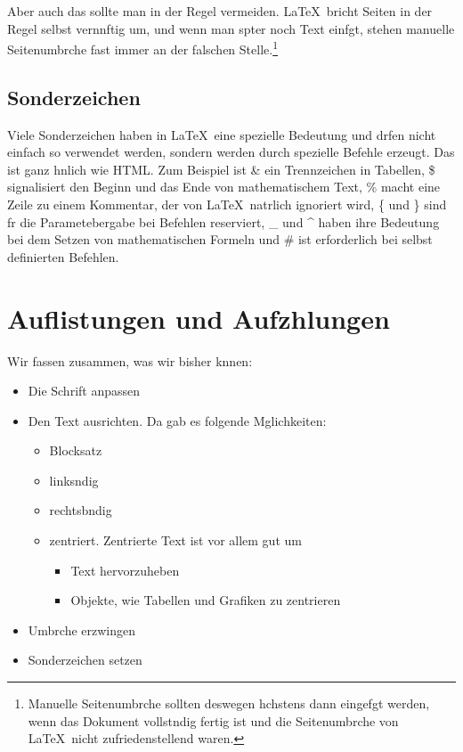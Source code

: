 \documentclass[11pt,a4paper]{article} %
\begin{document}
\newpage

Aber auch das sollte man in der Regel vermeiden. \LaTeX\ bricht Seiten in der Regel selbst vernnftig um, und wenn man spter noch Text einfgt, stehen manuelle Seitenumbrche fast immer an der falschen Stelle.\footnote{Manuelle Seitenumbrche sollten deswegen hchstens dann eingefgt werden, wenn das Dokument vollstndig fertig ist und die Seitenumbrche von \LaTeX\ nicht zufriedenstellend waren.}

\subsection{Sonderzeichen}
\label{Sonderzeichen}

Viele Sonderzeichen haben in \LaTeX\ eine spezielle Bedeutung und drfen nicht einfach so verwendet werden, sondern werden durch spezielle Befehle erzeugt. Das ist ganz hnlich wie HTML. Zum Beispiel ist \& ein Trennzeichen in Tabellen, \$ signalisiert den Beginn und das Ende von mathematischem Text, \% macht eine Zeile zu einem Kommentar, der von \LaTeX\ natrlich ignoriert wird, \{ und \} sind fr die Parametebergabe bei Befehlen reserviert, \_ und \^{} haben ihre Bedeutung bei dem Setzen von mathematischen Formeln und \# ist erforderlich bei selbst definierten Befehlen.



\section{Auflistungen und Aufzhlungen}
\label{Listen}

Wir fassen zusammen, was wir bisher knnen:

\begin{itemize}
 \item Die Schrift anpassen
 \item Den Text ausrichten. Da gab es folgende Mglichkeiten:
    \begin{itemize}
        \item Blocksatz
        \item linksndig
        \item rechtsbndig
        \item zentriert. Zentrierte Text ist vor allem gut um
            \begin{itemize}
                \item Text hervorzuheben
                \item Objekte, wie Tabellen und Grafiken zu zentrieren
            \end{itemize}
    \end{itemize}
 \item Umbrche erzwingen
 \item Sonderzeichen setzen
\end{itemize}
\end{document}
